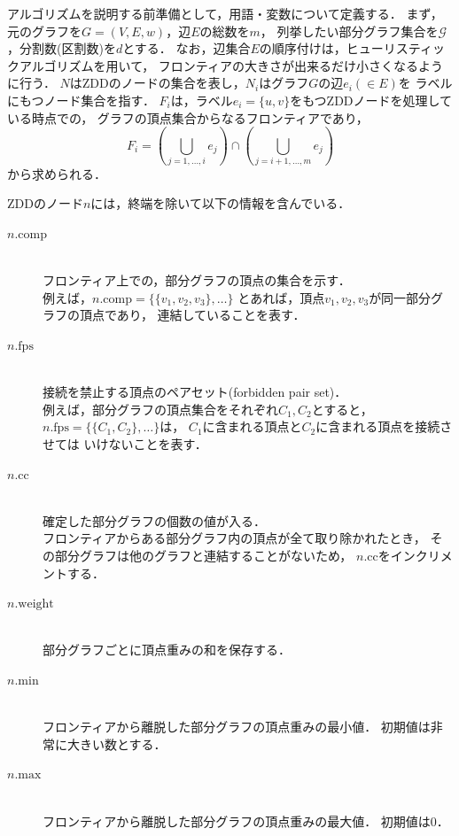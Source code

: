 アルゴリズムを説明する前準備として，用語・変数について定義する．
まず，元のグラフを$G=(V,E,w)$，辺$E$の総数を$m$，
列挙したい部分グラフ集合を$\mathcal{G}$，分割数(区割数)を$d$とする．
なお，辺集合$E$の順序付けは，ヒューリスティックアルゴリズムを用いて，
フロンティアの大きさが出来るだけ小さくなるように行う．
$N$はZDDのノードの集合を表し，$N_i$はグラフ$G$の辺$e_i (\in E)$を
ラベルにもつノード集合を指す．
$F_i$は，ラベル$e_i=\{u,v\}$をもつZDDノードを処理している時点での，
グラフの頂点集合からなるフロンティアであり，
$$ F_i=(\bigcup_{j=1,\ldots ,i}e_j)\cap (\bigcup_{j=i+1, \ldots, m} e_j) $$
から求められる．

ZDDのノード$n$には，終端を除いて以下の情報を含んでいる．

\begin{description}
  \item[$n.\mathrm{comp}$]\mbox{}\\
    フロンティア上での，部分グラフの頂点の集合を示す．\\
    例えば，$n.\mathrm{comp}=\{\{v_1,v_2,v_3\},\ldots\}$
    とあれば，頂点$v_1,v_2,v_3$が同一部分グラフの頂点であり，
    連結していることを表す．
  \item[$n.\mathrm{fps}$ ]\mbox{}\\
    接続を禁止する頂点のペアセット(forbidden pair set)．\\
    例えば，部分グラフの頂点集合をそれぞれ$C_1,C_2$とすると，
    $n.\mathrm{fps}=\{\{C_1,C_2\},\ldots\}$は，
    $C_1$に含まれる頂点と$C_2$に含まれる頂点を接続させては
    いけないことを表す．
  \item[$n.\mathrm{cc}$]\mbox{}\\
    確定した部分グラフの個数の値が入る．\\
    フロンティアからある部分グラフ内の頂点が全て取り除かれたとき，
    その部分グラフは他のグラフと連結することがないため，
    $n.\mathrm{cc}$をインクリメントする．
  \item[$n.\mathrm{weight}$]\mbox{}\\
    部分グラフごとに頂点重みの和を保存する．
  \item[$n.\mathrm{min}$]\mbox{}\\
    フロンティアから離脱した部分グラフの頂点重みの最小値．
    初期値は非常に大きい数とする．
  \item[$n.\mathrm{max}$]\mbox{}\\
    フロンティアから離脱した部分グラフの頂点重みの最大値．
    初期値は$0$．
\end{description}

